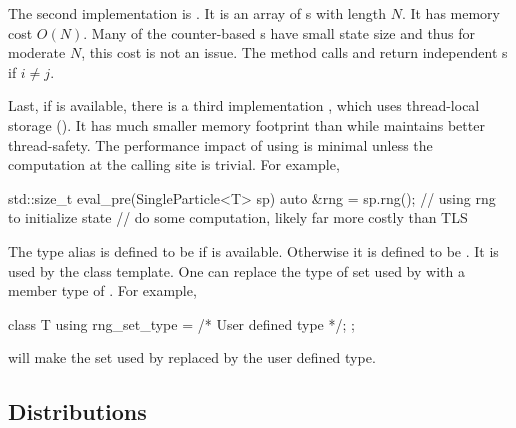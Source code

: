 The second implementation is . It is an array of
\rng{}s with length $N$. It has memory cost $O(N)$. Many of the counter-based
\rng{}s have small state size and thus for moderate $N$, this cost is not an
issue. The method calls  and 
return independent \rng{}s if $i \ne j$.

Last, if \tbb is available, there is a third implementation
, which uses thread-local storage (\tls). It has much
smaller memory footprint than  while maintains better
thread-safety. The performance impact of using \tls is minimal unless the
computation at the calling site is trivial. For example,
\begin{cppcode}
  std::size_t eval_pre(SingleParticle<T> sp)
  {
    auto &rng = sp.rng();
    // using rng to initialize state
    // do some computation, likely far more costly than TLS
  }
\end{cppcode}
The type alias  is defined to be  if
\tbb is available. Otherwise it is defined to be . It
is used by the  class template. One can replace the type of
\rng set used by  with a member type of .
For example,
\begin{cppcode}
  class T
  {
    using rng_set_type = /* User defined type */;
  };
\end{cppcode}
will make the \rng set used by  replaced by the user
defined type.

\subsection{Distributions}
\label{sub:Distributions}


